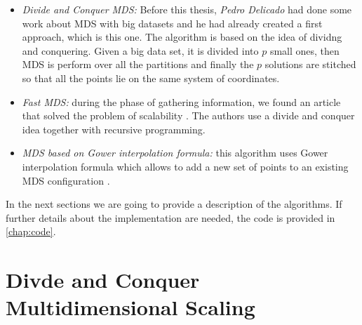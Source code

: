 \documentclass[11pt]{report}
\begin{document}
\begin{itemize}
\item \textit{Divide and Conquer MDS:} Before this thesis, 
\textit{Pedro Delicado} had done some work about  MDS with big
datasets and he had already created a first approach, which is this one. The 
algorithm is based on the idea of dividng and conquering. Given a big data set, 
it is divided into $p$ small ones, then MDS is perform over all the partitions
and finally the $p$ solutions are stitched so that all the points lie on the 
same system of coordinates.

\item \textit{Fast MDS:} during the phase of gathering information, we found an 
article that solved the problem of scalability \cite{Yang06afast}. The 
authors  use a divide and conquer idea together with recursive programming. 

\item \textit{MDS based on Gower interpolation formula:} this algorithm uses
Gower interpolation formula which allows to add a new set of points
to an existing MDS configuration \cite{gowerformula}. 

\end{itemize}

In the next sections we are going to provide a description of the algorithms. 
If further details about the implementation are needed, the code is provided in 
\autoref{chap:code}.

\section{Divde and Conquer Multidimensional Scaling}
\end{document}
